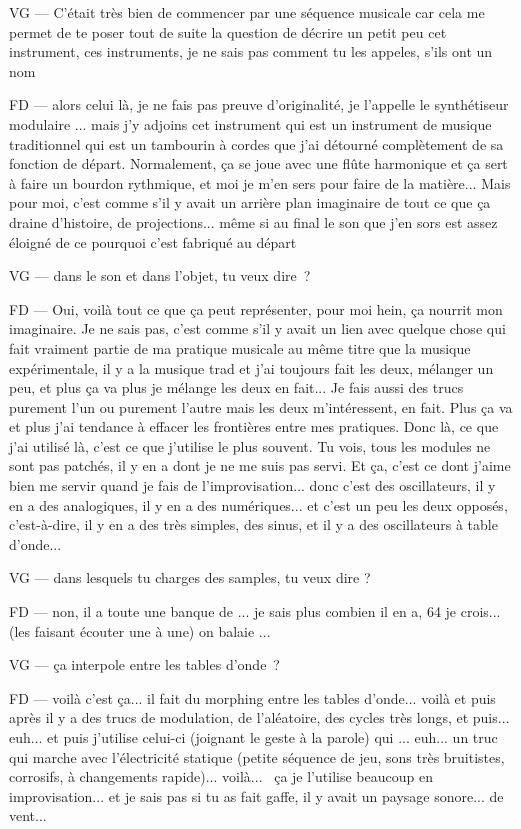 VG — C'était très bien de commencer par une séquence musicale car cela me permet de te poser tout de suite la question de décrire un petit peu cet instrument, ces instruments, je ne sais pas comment tu les appeles, s'ils ont un nom 

FD — alors celui là, je ne fais pas preuve d'originalité, je l'appelle le synthétiseur modulaire ... mais j'y adjoins cet instrument qui est un instrument de musique traditionnel qui est un tambourin à cordes que j'ai détourné complètement de sa fonction de départ. Normalement, ça se joue avec une flûte harmonique et ça sert à faire un bourdon rythmique, et moi je m'en sers pour faire de la matière... Mais pour moi, c'est comme s'il y avait un arrière plan imaginaire de tout ce que ça draine d'histoire, de projections... même si au final le son que j'en sors est assez éloigné de ce pourquoi c'est fabriqué au départ 

VG — dans le son et dans l'objet, tu veux dire ? 

FD — Oui, voilà tout ce que ça peut représenter, pour moi hein, ça nourrit mon imaginaire. Je ne sais pas, c'est comme s'il y avait un lien avec quelque chose qui fait vraiment partie de ma pratique musicale au même titre que la musique expérimentale, il  y a la musique trad et j'ai toujours fait les deux, mélanger un peu, et plus ça va plus je mélange les deux en fait... Je fais aussi des trucs purement l'un ou purement l'autre mais les deux m'intéressent, en fait. Plus ça va et plus j'ai tendance à effacer les frontières entre mes pratiques. Donc là, ce que j'ai utilisé là, c'est ce que j'utilise le plus souvent. Tu vois, tous les modules ne sont pas patchés, il y en a dont je ne me suis pas servi. Et ça, c'est ce dont j'aime bien me servir quand je fais de l'improvisation... donc c'est des oscillateurs, il y en a des analogiques, il y en a des numériques... et c'est un peu les deux opposés, c'est-à-dire, il y en a des très simples, des sinus, et il y a des oscillateurs à table d'onde... 

VG — dans lesquels tu charges des samples, tu veux dire ? 

FD — non, il a toute une banque de ... je sais plus combien il en a, 64 je crois... (les faisant écouter une à une) on balaie ... 

VG — ça interpole entre les tables d'onde ? 

FD — voilà c'est ça... il fait du morphing entre les tables d'onde... voilà et puis après il y a des trucs de modulation, de l'aléatoire, des cycles très longs, et puis... euh... et puis j'utilise celui-ci (joignant le geste à la parole) qui ... euh... un truc qui marche avec l'électricité statique (petite séquence de jeu, sons très bruitistes, corrosifs, à changements rapide)... voilà...  ça je l'utilise beaucoup en improvisation... et je sais pas si tu as fait gaffe, il y avait un paysage sonore... de vent... 

